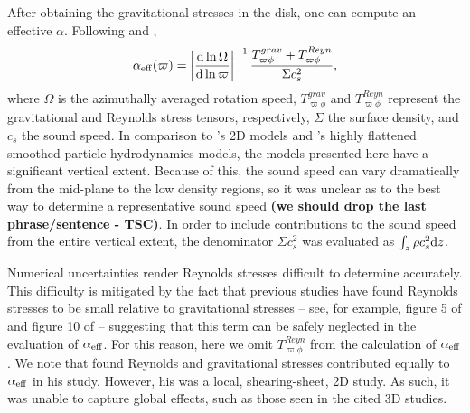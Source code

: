 \documentclass[manuscript]{aastex}
\begin{document}
After obtaining the gravitational stresses in the disk, one can compute an effective $\alpha$. 
Following \cite{gammie2001} and \citet{lodato2004}, 
\begin{equation}
\label{alpha1}
\alpha_{\rm{eff}}(\varpi) = \left| \frac{{\rm d} \ln \Omega}{{\rm d} \ln \varpi} \right|^{-1} 
\frac {T_{\varpi\phi}^{grav} + T_{\varpi\phi}^{Reyn}}
{\Sigma c_s^2 },
\end{equation}
where $\Omega$ is the azimuthally averaged rotation speed, $T_{\varpi\phi}^{grav}$ and $T_{\varpi\phi}^{Reyn}$ represent the  gravitational and Reynolds stress tensors, respectively, $\Sigma$ the surface density,
and $c_s$ the sound speed. In comparison to \citeauthor{gammie2001}'s 2D models and \citeauthor{lodato2004}'s highly flattened smoothed particle hydrodynamics models, the models presented here have a significant vertical extent. Because of this, the sound speed can vary dramatically from the mid-plane to the low density regions, so it was unclear as to the best way to determine a representative sound speed {\bf (we should drop the last phrase/sentence - TSC)}. In order to include contributions to the sound speed from the entire vertical extent, the denominator $\Sigma c_s^2$ was evaluated as $\int_z \rho c_s^2 {\rm d}z$.
 
  

Numerical uncertainties render Reynolds stresses difficult to determine accurately. 
This difficulty is mitigated by the fact that 
previous studies have found Reynolds stresses to be small relative to gravitational stresses -- see, 
for example, figure 5 of \cite{lodato2004} and figure 10 of \cite{boley2006} -- suggesting that this term
can be safely neglected in the evaluation of $\alpha_{\rm{eff}}$.   For this reason, 
here we omit
$T_{\varpi\phi}^{Reyn}$ from the calculation of $\alpha_{\rm{eff}}$. 
We note that \cite{gammie2001}  found
Reynolds and gravitational stresses contributed equally to $\alpha_{\rm{eff}}$ in his study.  However,
his was a local, shearing-sheet, 2D study.  As such, it was unable to capture global effects, such
as those seen in the cited 3D studies.  
\end{document}
